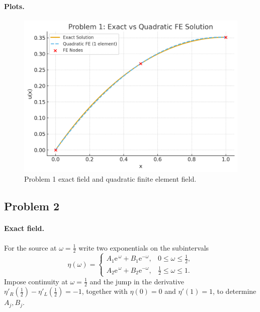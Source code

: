 \paragraph{Plots.}
\begin{figure}[H]
  \centering
  \includegraphics[width=0.7\linewidth]{hw3_prob1.png}
  \caption{Problem 1 exact field and quadratic finite element field.}
\end{figure}

\subsection*{Problem 2}
\paragraph{Exact field.}
For the source at \(\omega=\tfrac12\) write two exponentials on the subintervals
\[
\eta(\omega)=
\begin{cases}
A_1 \mathrm e^{\,\omega}+B_1 \mathrm e^{−\omega}, & 0\le \omega\le \tfrac12,\\[2pt]
A_2 \mathrm e^{\,\omega}+B_2 \mathrm e^{−\omega}, & \tfrac12\le \omega\le 1.
\end{cases}
\]
Impose continuity at \(\omega=\tfrac12\) and the jump in the derivative
\(
\eta'_R(\tfrac12)−\eta'_L(\tfrac12)=−1
\),
together with \(\eta(0)=0\) and \(\eta'(1)=1\), to determine \(A_j,B_j\).

